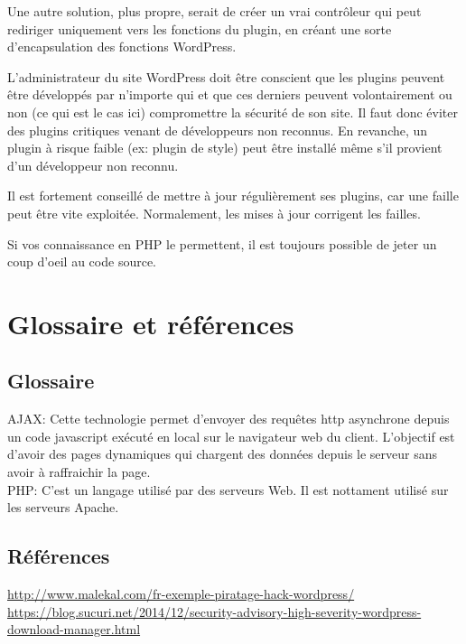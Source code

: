 \documentclass[a4paper,oneside,10pt]{article}
\begin{document}
Une autre solution, plus propre, serait de créer un vrai contrôleur qui peut rediriger uniquement vers les fonctions du plugin, en créant une sorte d’encapsulation des fonctions WordPress. 

L’administrateur du site WordPress doit être conscient que les plugins peuvent être développés par n’importe qui et que ces derniers peuvent volontairement ou non (ce qui est le cas ici) compromettre la sécurité de son site. Il faut donc éviter des plugins critiques venant de développeurs non reconnus. En revanche, un plugin à risque faible (ex: plugin de style) peut être installé même s’il provient d’un développeur non reconnu.

Il est fortement conseillé de mettre à jour régulièrement ses plugins, car une faille peut être vite exploitée. Normalement, les mises à jour corrigent les failles. 

Si vos connaissance en PHP le permettent, il est toujours possible de jeter un coup d’oeil au code source.

\section{Glossaire et références}
\subsection{Glossaire}
AJAX: Cette technologie permet d'envoyer des requêtes http asynchrone depuis un code javascript exécuté en local sur le navigateur web du client. L'objectif est d'avoir des pages dynamiques qui chargent des données depuis le serveur sans avoir à raffraichir la page.
\\
PHP: C'est un langage utilisé par des serveurs Web. Il est nottament utilisé sur les serveurs Apache.
\\
\subsection{Références}
\url{http://www.malekal.com/fr-exemple-piratage-hack-wordpress/}
\\
\url{https://blog.sucuri.net/2014/12/security-advisory-high-severity-wordpress-download-manager.html}
\end{document}
